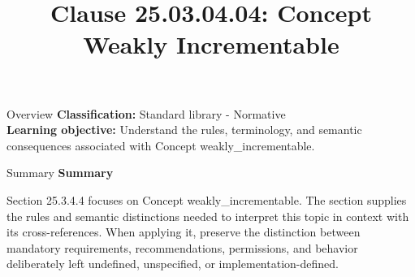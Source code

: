 \documentclass[10pt,letterpaper]{article}
\title{Clause 25.03.04.04: Concept Weakly Incrementable}
\author{}
\date{}
\begin{document}
\maketitle
\begin{CornellOverviewBox}{Overview}
\textbf{Classification:} Standard library - Normative\\[2pt]
\textbf{Learning objective:} Understand the rules, terminology, and semantic consequences associated with Concept weakly\_incrementable.
\end{CornellOverviewBox}\begin{CornellSummaryBox}{Summary}
{\sffamily\bfseries\color{Accent} Summary}\par\vspace{3pt}Section 25.3.4.4 focuses on Concept weakly\_incrementable. The section supplies the rules and semantic distinctions needed to interpret this topic in context with its cross-references. When applying it, preserve the distinction between mandatory requirements, recommendations, permissions, and behavior deliberately left undefined, unspecified, or implementation-defined.
\end{CornellSummaryBox}
\end{document}
